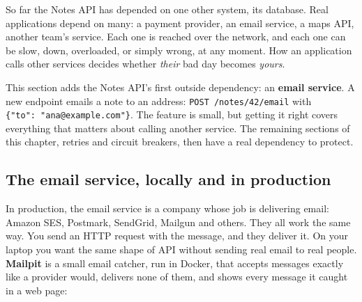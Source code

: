 So far the Notes API has depended on one other system, its database. Real applications depend on many: a payment provider, an email service, a maps API, another team's service. Each one is reached over the network, and each one can be slow, down, overloaded, or simply wrong, at any moment. How an application calls other services decides whether \emph{their} bad day becomes \emph{yours}.

This section adds the Notes API's first outside dependency: an \textbf{email service}. A new endpoint emails a note to an address: \texttt{POST\ /}\allowbreak{}\texttt{notes/}\allowbreak{}\texttt{42/}\allowbreak{}\texttt{email} with \texttt{\{"to":}\allowbreak{}\texttt{\ "ana@example.}\allowbreak{}\texttt{com"\}}. The feature is small, but getting it right covers everything that matters about calling another service. The remaining sections of this chapter, retries and circuit breakers, then have a real dependency to protect.

\subsection*{The email service, locally and in production}\label{37-reliability:the-email-service-locally-and-in-production}

In production, the email service is a company whose job is delivering email: Amazon SES, Postmark, SendGrid, Mailgun and others. They all work the same way. You send an HTTP request with the message, and they deliver it. On your laptop you want the same shape of API without sending real email to real people. \textbf{Mailpit} is a small email catcher, run in Docker, that accepts messages exactly like a provider would, delivers none of them, and shows every message it caught in a web page:

\begin{codebox}[short]

\begin{Shaded}
\begin{Highlighting}[]
 
\end{Highlighting}
\end{Shaded}

\end{codebox}

